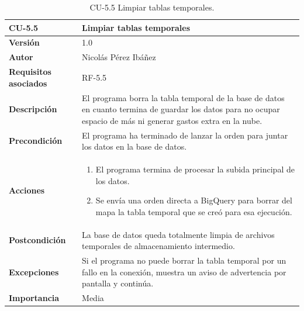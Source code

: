 \begin{table}[p]
	\centering
	\begin{tabularx}{\linewidth}{ p{} p{} }
		\toprule
		\textbf{CU-5.5}  & \textbf{Limpiar tablas temporales}\\
		\toprule
		\textbf{Versión}              & 1.0    \\
		\textbf{Autor}                & Nicolás Pérez Ibáñez \\
		\textbf{Requisitos asociados} & RF-5.5 \\
		\textbf{Descripción}          & El programa borra la tabla temporal de la base de datos en cuanto termina de guardar los datos para no ocupar espacio de más ni generar gastos extra en la nube. \\
		\textbf{Precondición}         & El programa ha terminado de lanzar la orden para juntar los datos en la base de datos. \\
		\textbf{Acciones}             &
		\begin{enumerate}
			\def\labelenumi{\arabic{enumi}.}
			\tightlist
			\item El programa termina de procesar la subida principal de los datos.
			\item Se envía una orden directa a BigQuery para borrar del mapa la tabla temporal que se creó para esa ejecución.
		\end{enumerate}\\
		\textbf{Postcondición}        & La base de datos queda totalmente limpia de archivos temporales de almacenamiento intermedio. \\
		\textbf{Excepciones}          & Si el programa no puede borrar la tabla temporal por un fallo en la conexión, muestra un aviso de advertencia por pantalla y continúa. \\
		\textbf{Importancia}          & Media \\
		\bottomrule
	\end{tabularx}
	\caption{CU-5.5 Limpiar tablas temporales.}
\end{table}

